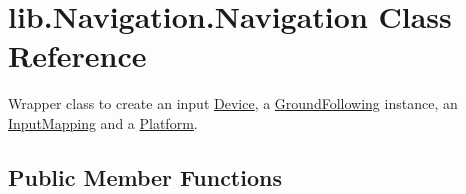 \hypertarget{classlib_1_1Navigation_1_1Navigation}{\section{lib.\-Navigation.\-Navigation \-Class \-Reference}
\label{classlib_1_1Navigation_1_1Navigation}
}


\-Wrapper class to create an input \hyperlink{namespacelib_1_1Device}{\-Device}, a \hyperlink{namespacelib_1_1GroundFollowing}{\-Ground\-Following} instance, an \hyperlink{namespacelib_1_1InputMapping}{\-Input\-Mapping} and a \hyperlink{namespacelib_1_1Platform}{\-Platform}.  


\subsection*{\-Public \-Member \-Functions}
